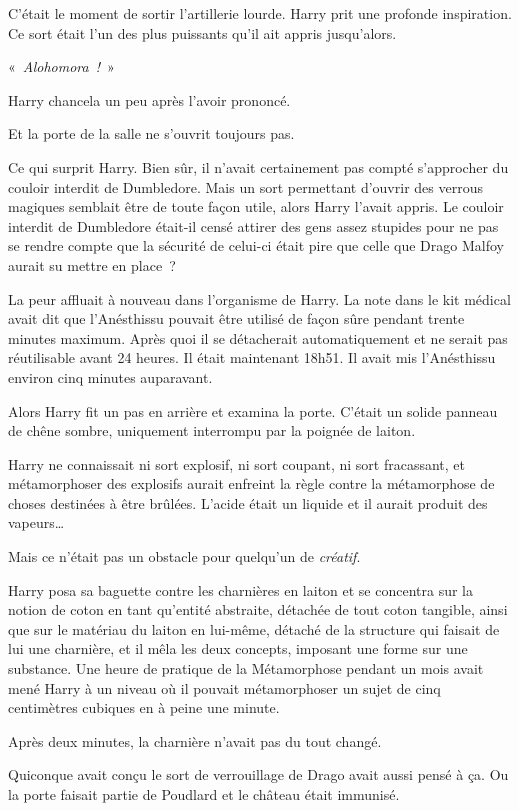 C'était le moment de sortir l'artillerie lourde. Harry prit une profonde inspiration. Ce sort était l'un des plus puissants qu'il ait appris jusqu'alors.

«~\emph{Alohomora~!}~»

Harry chancela un peu après l'avoir prononcé.

Et la porte de la salle ne s'ouvrit toujours pas.

Ce qui surprit Harry. Bien sûr, il n'avait certainement pas compté s'approcher du couloir interdit de Dumbledore. Mais un sort permettant d'ouvrir des verrous magiques semblait être de toute façon utile, alors Harry l'avait appris. Le couloir interdit de Dumbledore était-il censé attirer des gens assez stupides pour ne pas se rendre compte que la sécurité de celui-ci était pire que celle que Drago Malfoy aurait su mettre en place~?

La peur affluait à nouveau dans l'organisme de Harry. La note dans le kit médical avait dit que l'Anésthissu pouvait être utilisé de façon sûre pendant trente minutes maximum. Après quoi il se détacherait automatiquement et ne serait pas réutilisable avant 24 heures. Il était maintenant 18h51. Il avait mis l'Anésthissu environ cinq minutes auparavant.

Alors Harry fit un pas en arrière et examina la porte. C'était un solide panneau de chêne sombre, uniquement interrompu par la poignée de laiton.

Harry ne connaissait ni sort explosif, ni sort coupant, ni sort fracassant, et métamorphoser des explosifs aurait enfreint la règle contre la métamorphose de choses destinées à être brûlées. L'acide était un liquide et il aurait produit des vapeurs…

Mais ce n'était pas un obstacle pour quelqu'un de \emph{créatif}.

Harry posa sa baguette contre les charnières en laiton et se concentra sur la notion de coton en tant qu'entité abstraite, détachée de tout coton tangible, ainsi que sur le matériau du laiton en lui-même, détaché de la structure qui faisait de lui une charnière, et il mêla les deux concepts, imposant une forme sur une substance. Une heure de pratique de la Métamorphose pendant un mois avait mené Harry à un niveau où il pouvait métamorphoser un sujet de cinq centimètres cubiques en à peine une minute.

Après deux minutes, la charnière n'avait pas du tout changé.

Quiconque avait conçu le sort de verrouillage de Drago avait aussi pensé à ça. Ou la porte faisait partie de Poudlard et le château était immunisé.

